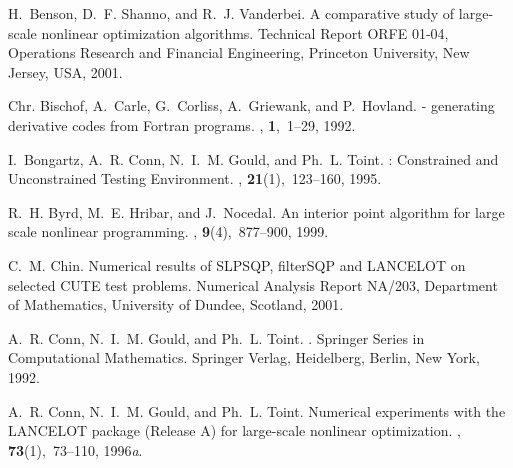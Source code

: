 \documentclass[twoside]{article}
\begin{document}
%
%
\begin{thebibliography}{xx}

H.~Benson, D.~F. Shanno, and R.~J. Vanderbei.
\newblock A comparative study of large-scale nonlinear optimization algorithms.
\newblock Technical Report ORFE 01-04, Operations Research and Financial
  Engineering, Princeton University, New Jersey, USA, 2001.

Chr. Bischof, A.~Carle, G.~Corliss, A.~Griewank, and P.~Hovland.
 - generating derivative codes from {F}ortran programs.
, {\bf 1},~1--29, 1992.

I.~Bongartz, A.~R. Conn, N.~I.~M. Gould, and Ph.~L. Toint.
: {C}onstrained and {U}nconstrained {T}esting
  {E}nvironment.
, {\bf
  21}(1),~123--160, 1995.

R.~H. Byrd, M.~E. Hribar, and J.~Nocedal.
\newblock An interior point algorithm for large scale nonlinear programming.
, {\bf 9}(4),~877--900, 1999.

C.~M. Chin.
\newblock Numerical results of {SLPSQP}, filter{SQP} and {LANCELOT} on selected
  {CUTE} test problems.
\newblock Numerical Analysis Report NA/203, Department of Mathematics,
  University of Dundee, Scotland, 2001.

A.~R. Conn, N.~I.~M. Gould, and Ph.~L. Toint.
.
\newblock Springer Series in Computational Mathematics. Springer Verlag,
  Heidelberg, Berlin, New York, 1992.

A.~R. Conn, N.~I.~M. Gould, and Ph.~L. Toint.
\newblock Numerical experiments with the {{\sf LANCELOT}} package ({R}elease
  {A}) for large-scale nonlinear optimization.
, {\bf 73}(1),~73--110,
  1996{\em a}.


\end{thebibliography}
\end{document}
